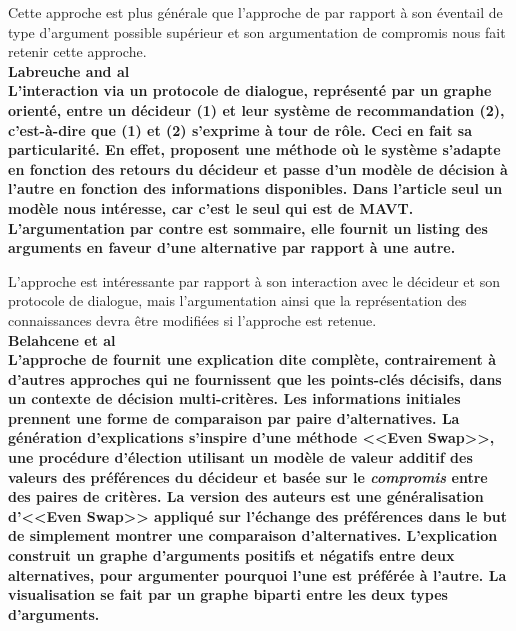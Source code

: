 \documentclass[a4paper, 11pt]{article}
\renewcommand{\textbf}[1]{\begingroup\bfseries\mathversion{bold}#1\endgroup}
\begin{document}
Cette approche est plus générale que l'approche de \textcolor{blue}{\citep{LABREUCHE20111410}} par rapport à son éventail de type d'argument possible supérieur et son argumentation de compromis nous fait retenir cette approche.\\

\noindent \textbf{Labreuche and al}\\ %

L'interaction via un protocole de dialogue, représenté par un graphe orienté, entre un décideur (1) et leur système de recommandation (2), c'est-à-dire que (1) et (2) s'exprime à tour de rôle. Ceci en fait sa particularité. En effet, \textcolor{blue}{\citep{Labreuche2015}} proposent une méthode où le système s'adapte en fonction des retours du décideur et passe d'un modèle de décision à l'autre en fonction des informations disponibles. Dans l'article seul un modèle nous intéresse, car c'est le seul qui est de MAVT. L'argumentation par contre est sommaire, elle fournit un listing des arguments en faveur d'une alternative par rapport à une autre.

L'approche est intéressante par rapport à son interaction avec le décideur et son protocole de dialogue, mais l'argumentation ainsi que la représentation des connaissances devra être modifiées si l'approche est retenue.\\

\noindent \textbf{Belahcene et al}\\ %

L'approche de \textcolor{blue}{\citep{Belahcene2017}} fournit une explication dite complète, contrairement à d'autres approches qui ne fournissent que les points-clés décisifs, dans un contexte de décision multi-critères. Les informations initiales prennent une forme de comparaison par paire d'alternatives.%
La génération d'explications s'inspire d'une méthode <<Even Swap>>, une procédure d'élection utilisant un modèle de valeur additif des valeurs des préférences du décideur et basée sur le \textit{compromis} entre des paires de critères. La version des auteurs est une généralisation d'<<Even Swap>> appliqué sur l'échange des préférences dans le but de simplement montrer une comparaison d'alternatives.
L'explication construit un graphe d'arguments positifs et négatifs entre deux alternatives, pour argumenter pourquoi l'une est préférée à l'autre. La visualisation se fait par un graphe biparti entre les deux types d'arguments.
\end{document}

